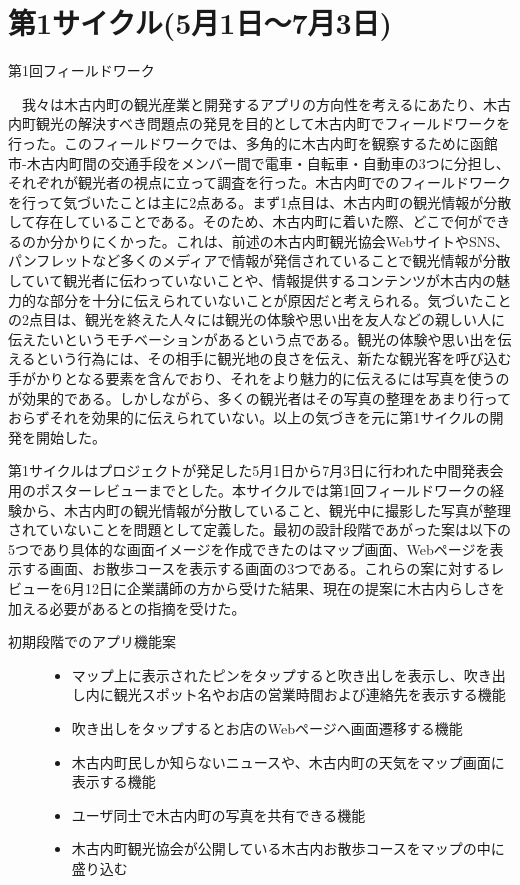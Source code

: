 \section{第1サイクル(5月1日〜7月3日)}

\begin{description}
\item[第1回フィールドワーク]\mbox{}
\end{description}
　我々は木古内町の観光産業と開発するアプリの方向性を考えるにあたり、木古内町観光の解決すべき問題点の発見を目的として木古内町でフィールドワークを行った。このフィールドワークでは、多角的に木古内町を観察するために函館市-木古内町間の交通手段をメンバー間で電車・自転車・自動車の3つに分担し、それぞれが観光者の視点に立って調査を行った。木古内町でのフィールドワークを行って気づいたことは主に2点ある。まず1点目は、木古内町の観光情報が分散して存在していることである。そのため、木古内町に着いた際、どこで何ができるのか分かりにくかった。これは、前述の木古内町観光協会WebサイトやSNS、パンフレットなど多くのメディアで情報が発信されていることで観光情報が分散していて観光者に伝わっていないことや、情報提供するコンテンツが木古内の魅力的な部分を十分に伝えられていないことが原因だと考えられる。気づいたことの2点目は、観光を終えた人々には観光の体験や思い出を友人などの親しい人に伝えたいというモチベーションがあるという点である。観光の体験や思い出を伝えるという行為には、その相手に観光地の良さを伝え、新たな観光客を呼び込む手がかりとなる要素を含んでおり、それをより魅力的に伝えるには写真を使うのが効果的である。しかしながら、多くの観光者はその写真の整理をあまり行っておらずそれを効果的に伝えられていない。以上の気づきを元に第1サイクルの開発を開始した。

第1サイクルはプロジェクトが発足した5月1日から7月3日に行われた中間発表会用のポスターレビューまでとした。本サイクルでは第1回フィールドワークの経験から、木古内町の観光情報が分散していること、観光中に撮影した写真が整理されていないことを問題として定義した。最初の設計段階であがった案は以下の5つであり具体的な画面イメージを作成できたのはマップ画面、Webページを表示する画面、お散歩コースを表示する画面の3つである。これらの案に対するレビューを6月12日に企業講師の方から受けた結果、現在の提案に木古内らしさを加える必要があるとの指摘を受けた。
\begin{description}
\item[初期段階でのアプリ機能案]\mbox{}
\begin{itemize}
 \item マップ上に表示されたピンをタップすると吹き出しを表示し、吹き出し内に観光スポット名やお店の営業時間および連絡先を表示する機能
  \item 吹き出しをタップするとお店のWebページへ画面遷移する機能
 \item 木古内町民しか知らないニュースや、木古内町の天気をマップ画面に表示する機能
 \item ユーザ同士で木古内町の写真を共有できる機能
 \item 木古内町観光協会が公開している木古内お散歩コースをマップの中に盛り込む
\end{itemize}
\end{description}

